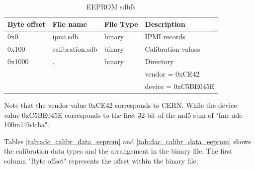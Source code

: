\documentclass[11pt,a4paper]{article}
\begin{document}
\begin{table}[ht]
  \centering
  \begin{tabularx}{\textwidth}{| l | l | l | X |}
    \hline
    \textbf{Byte offset} & \textbf{File name}  & \textbf{File Type} & \textbf{Description} \\
    \hline
    0x0 & ipmi.sdb & binary & IPMI records \\
    \hline
    0x100 & calibration.sdb & binary & Calibration values \\
    \hline
    0x1000 & . & binary & Directory \\
    & & & vendor = 0xCE42 \\
    & & & device = 0xC5BE045E \\
    \hline
  \end{tabularx}
  \caption{EEPROM sdbfs}
  \label{tab:eeprom_sdbfs}
\end{table}

Note that the vendor value 0xCE42 corresponds to CERN. While the device value 0xC5BE045E corresponds to the first 32-bit of the md5 sum of "fmc-adc-100m14b4cha".

Tables \ref{tab:adc_calibr_data_eeprom} and \ref{tab:dac_calibr_data_eeprom} shows the calibration data types and the arrangement in the binary file.
The first column "Byte offset" represents the offset within the binary file.
\end{document}
